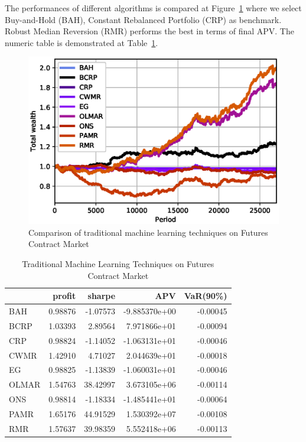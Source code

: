 The performances of different algorithms is compared at Figure~\ref{fig:algo} where we select Buy-and-Hold (BAH), Constant Rebalanced Portfolio (CRP) as benchmark. Robust Median Reversion (RMR) performs the best in terms of final APV. The numeric table is demonstrated at Table~\ref{tab:my_label}. 

\begin{figure}
    \centering
    \includegraphics{img/algos.eps}
    \caption{Comparison of traditional machine learning techniques on Futures Contract Market}
    \label{fig:algo}
\end{figure}

\begin{table}[]
    \centering
\begin{tabular}{lrrrr}
\toprule
{} &   profit &    sharpe &           APV &  VaR(90\%) \\
\midrule
BAH   &  0.98876 &  -1.07573 & -9.885370e+00 &  -0.00045 \\
BCRP  &  1.03393 &   2.89564 &  7.971866e+01 &  -0.00094 \\
CRP   &  0.98824 &  -1.14052 & -1.063131e+01 &  -0.00046 \\
CWMR  &  1.42910 &   4.71027 &  2.044639e+01 &  -0.00018 \\
EG    &  0.98825 &  -1.13839 & -1.060031e+01 &  -0.00046 \\
OLMAR &  1.54763 &  38.42997 &  3.673105e+06 &  -0.00114 \\
ONS   &  0.98814 &  -1.18334 & -1.485441e+01 &  -0.00064 \\
PAMR  &  1.65176 &  44.91529 &  1.530392e+07 &  -0.00108 \\
RMR   &  1.57637 &  39.98359 &  5.552418e+06 &  -0.00113 \\
\bottomrule
\end{tabular}

    \caption{Traditional Machine Learning Techniques on Futures Contract Market}
    \label{tab:my_label}
\end{table}



